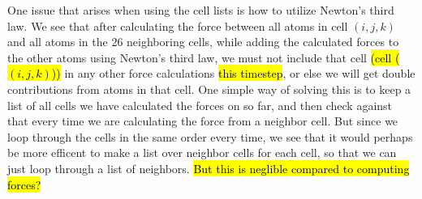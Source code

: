 One issue that arises when using the cell lists is how to utilize Newton's third law. We see that after calculating the force between all atoms in cell $(i,j,k)$ and all atoms in the 26 neighboring cells, while adding the calculated forces to the other atoms using Newton's third law, we must not include that cell \hl{(cell ($(i,j,k)$))} in any other force calculations \hl{this timestep}, or else we will get double contributions from atoms in that cell. One simple way of solving this is to keep a list of all cells we have calculated the forces on so far, and then check against that every time we are calculating the force from a neighbor cell. But since we loop through the cells in the same order every time, we see that it would perhaps be more efficent to make a list over neighbor cells for each cell, so that we can just loop through a list of neighbors. \hl{But this is neglible compared to computing forces?}

